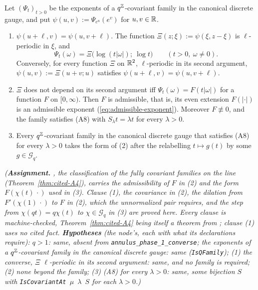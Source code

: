 \begin{theorem}
\label{thm:annulus-parametrization-phase}
\leanok
{}
Let $(\Psi_t)_{t > 0}$ be the exponents of a $q^{\mathbb{Z}}$-covariant family in the canonical discrete
gauge, and put $\psi(u,v) := \Psi_{e^u}(e^v)$ for $u, v \in \mathbb{R}$.
\begin{enumerate}
\item $\psi(u + \ell, v) = \psi(u, v + \ell)$. The function $\Xi(z;\xi) := \psi(\xi, z - \xi)$ is
$\ell$-periodic in $\xi$, and
\[
  \Psi_t(\omega) = \Xi\bigl(\log(t|\omega|);\ \log t\bigr) \qquad (t > 0,\ \omega \ne 0).
\]
Conversely, for every function $\Xi$ on $\mathbb{R}^2$, $\ell$-periodic in its second argument,
$\psi(u,v) := \Xi(u + v; u)$ satisfies $\psi(u + \ell, v) = \psi(u, v + \ell)$.
\item $\Xi$ does not depend on its second argument iff $\Psi_t(\omega) = F(t|\omega|)$ for a
function $F$ on $[0,\infty)$. Then $F$ is admissible, that is, its even extension $F(|\cdot|)$ is an
admissible exponent (\ref{eq:admissible-exponent}). Moreover $F \not\equiv 0$, and the family
satisfies (A8) with $S_\lambda t = \lambda t$ for every $\lambda > 0$.
\item Every $q^{\mathbb{Z}}$-covariant family in the canonical discrete gauge that satisfies (A8) for
every $\lambda > 0$ takes the form of (2) after the relabelling $t \mapsto g(t)$ by some
$g \in \mathcal{G}_q$.
\end{enumerate}
\statusA\quad{}\quad\emph{(\textbf{Assignment.} , the classification of the
fully covariant families on the line (Theorem~\ref{thm:cited-A4}), carries the admissibility of $F$ in (2) and the
form $F(\chi(t)\,\cdot)$ used in (3). Clause (1), the covariance in (2), the dilation from
$F'(\chi(1)\,\cdot)$ to $F$ in (2), which the unnormalized pair requires, and the step from
$\chi(qt) = q\chi(t)$ to $\chi \in \mathcal{G}_q$ in (3) are proved here. Every clause is
machine-checked, Theorem~\ref{thm:cited-A4} being itself a theorem from ; clause (1)
uses no cited fact. \textbf{Hypotheses} (the node's, each with what its declarations require):
$q > 1$: same, absent from \texttt{annulus\_phase\_1\_converse}; the exponents of a
$q^{\mathbb{Z}}$-covariant family in the canonical discrete gauge: same (\texttt{IsQFamily}); (1) the
converse, $\Xi$ $\ell$-periodic in its second argument: same, and no family is required; (2) none
beyond the family; (3) (A8) for every $\lambda > 0$: same, some bijection $S$ with
\texttt{IsCovariantAt}~$\mu$~$\lambda$~$S$ for each $\lambda > 0$.)}
\end{theorem}

